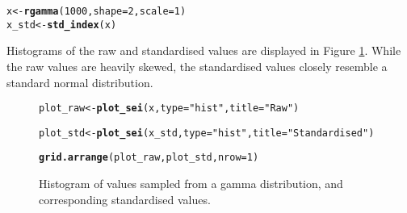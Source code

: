 \documentclass[article,shortnames,nojss]{jss}\usepackage[]{graphicx}\usepackage[]{xcolor}
\makeatletter
\newcommand{\hlnum}[1]{\textcolor[rgb]{0.686,0.059,0.569}{#1}}%
\newcommand{\hlstr}[1]{\textcolor[rgb]{0.192,0.494,0.8}{#1}}%
\newcommand{\hlstd}[1]{\textcolor[rgb]{0.345,0.345,0.345}{#1}}%
\newcommand{\hlkwb}[1]{\textcolor[rgb]{0.69,0.353,0.396}{#1}}%
\newcommand{\hlkwc}[1]{\textcolor[rgb]{0.333,0.667,0.333}{#1}}%
\newcommand{\hlkwd}[1]{\textcolor[rgb]{0.737,0.353,0.396}{\textbf{#1}}}%
\newenvironment{kframe}{%
 \def\at@end@of@kframe{}%
 \ifinner\ifhmode%
  \def\at@end@of@kframe{\end{minipage}}%
  \begin{minipage}{\columnwidth}%
 \fi\fi%
 \def\FrameCommand##1{\hskip\@totalleftmargin \hskip-\fboxsep
 \colorbox{shadecolor}{##1}\hskip-\fboxsep
     \hskip-\linewidth \hskip-\@totalleftmargin \hskip\columnwidth}%
 \MakeFramed {\advance\hsize-\width
   \@totalleftmargin\z@ \linewidth\hsize
   \@setminipage}}%
 {\par\unskip\endMakeFramed%
 \at@end@of@kframe}
\newenvironment{knitrout}{}{} %
\makeatother
\begin{document}
\begin{knitrout}
\color{fgcolor}\begin{kframe}
\begin{alltt}
\hlstd{x} \hlkwb{<-} \hlkwd{rgamma}\hlstd{(}\hlnum{1000}\hlstd{,} \hlkwc{shape} \hlstd{=} \hlnum{2}\hlstd{,} \hlkwc{scale} \hlstd{=} \hlnum{1}\hlstd{)}
\hlstd{x_std} \hlkwb{<-} \hlkwd{std_index}\hlstd{(x)}
\end{alltt}


{\ttfamily\noindent\bfseries{}}\end{kframe}
\end{knitrout}

Histograms of the raw and standardised values are displayed in Figure \ref{fig:hist_ex}. While the raw values are heavily skewed, the standardised values closely resemble a standard normal distribution.

\begin{figure}
\begin{knitrout}
\color{fgcolor}\begin{kframe}
\begin{alltt}
\hlstd{plot_raw} \hlkwb{<-} \hlkwd{plot_sei}\hlstd{(x,} \hlkwc{type} \hlstd{=} \hlstr{"hist"}\hlstd{,} \hlkwc{title} \hlstd{=} \hlstr{"Raw"}\hlstd{)}
\end{alltt}


{\ttfamily\noindent\bfseries{}}\begin{alltt}
\hlstd{plot_std} \hlkwb{<-} \hlkwd{plot_sei}\hlstd{(x_std,} \hlkwc{type} \hlstd{=} \hlstr{"hist"}\hlstd{,} \hlkwc{title} \hlstd{=} \hlstr{"Standardised"}\hlstd{)}
\end{alltt}


{\ttfamily\noindent\bfseries{}}\begin{alltt}
\hlkwd{grid.arrange}\hlstd{(plot_raw, plot_std,} \hlkwc{nrow} \hlstd{=} \hlnum{1}\hlstd{)}
\end{alltt}


{\ttfamily\noindent\bfseries\color{errorcolor}{\#\# Error in eval(expr, envir, enclos): object 'plot\_raw' not found}}\end{kframe}
\end{knitrout}
\caption{Histogram of values sampled from a gamma distribution, and corresponding standardised values.}
\label{fig:hist_ex}
\end{figure}
\end{document}
